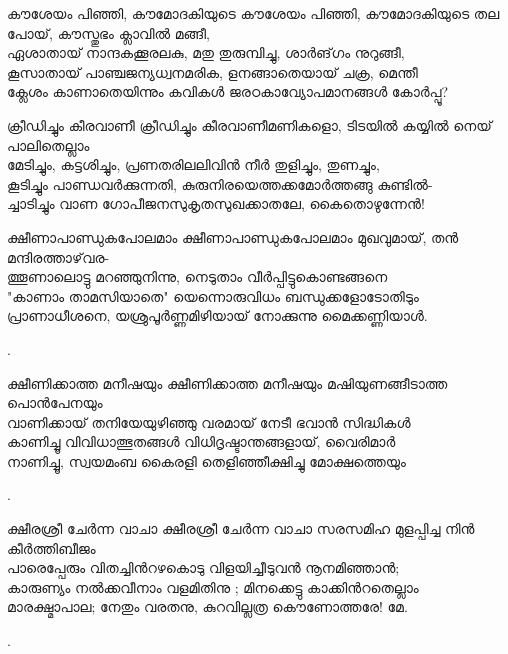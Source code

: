 \begin{enumerate}

\begin{slokam}{\VSr}{\AR}{കൗശേയം പിഞ്ഞി, കൗമോദകിയുടെ}
കൗശേയം പിഞ്ഞി, കൗമോദകിയുടെ തല പോയ്, കൗസ്തുഭം ക്ലാവിൽ മങ്ങീ,\\
ഏശാതായ് നാന്ദകക്കൂരലകു, മതു തുരുമ്പിച്ചു, ശാർങ്‌ഗം നുറുങ്ങീ,\\
കൂസാതായ് പാഞ്ചജന്യധ്വനമരിക, ളനങ്ങാതെയായ് ചക്ര, മെന്തീ \\
ക്ലേശം കാണാതെയിന്നും കവികൾ ജരഠകാവ്യോപമാനങ്ങൾ കോർപ്പൂ? 
\end{slokam}



\begin{slokam}{\VSr}{\VenM}{ക്രീഡിച്ചും കീരവാണീ}
ക്രീഡിച്ചും കീരവാണീമണികളൊ, ടിടയിൽ കയ്യിൽ നെയ്‌ പാലിതെല്ലാം\\
മേടിച്ചും, കട്ടശിച്ചും, പ്രണതരിലലിവിൻ നീർ തുളിച്ചും, തുണച്ചും,\\
കൂടിച്ചും പാണ്ഡവർക്കുന്നതി, കുരുനിരയെത്തക്കമോർത്തങ്ങു കുണ്ടിൽ-\\
ച്ചാടിച്ചും വാണ ഗോപീജനസുകൃതസുഖക്കാതലേ, കൈതൊഴുന്നേൻ!
\end{slokam}


\begin{slokam}{\VSv}{\VNM}{ക്ഷീണാപാണ്ഡുകപോലമാം}
ക്ഷീണാപാണ്ഡുകപോലമാം മുഖവുമായ്‌, തൻ മന്ദിരത്താഴ്‌വര-\\
ത്തൂണാലൊട്ടു മറഞ്ഞുനിന്നു, നെടുതാം വീർപ്പിട്ടുകൊണ്ടങ്ങനെ\\
"കാണാം താമസിയാതെ" യെന്നൊരുവിധം ബന്ധുക്കളോടോതിടും\\
പ്രാണാധീശനെ, യശ്രുപൂർണ്ണമിഴിയായ്‌ നോക്കുന്നു മൈക്കണ്ണിയാള്‍.
\end{slokam}


.



\begin{slokam}{\VSv}{\KA}{ക്ഷീണിക്കാത്ത മനീഷയും}
ക്ഷീണിക്കാത്ത മനീഷയും മഷിയുണങ്ങീടാത്ത പൊൻപേനയും\\
വാണിക്കായ്‌ തനിയേയുഴിഞ്ഞു വരമായ്‌ നേടീ ഭവാൻ സിദ്ധികള്‍\\
കാണിച്ചൂ വിവിധാത്ഭുതങ്ങള്‍ വിധിദൃഷ്ടാന്തങ്ങളായ്‌, വൈരിമാർ\\
നാണിച്ചൂ, സ്വയമംബ കൈരളി തെളിഞ്ഞീക്ഷിച്ചു മോക്ഷത്തെയും
\end{slokam}


.

\begin{slokam}{\VSr}{\Unk}{ക്ഷീരശ്രീ ചേർന്ന വാചാ}
ക്ഷീരശ്രീ ചേർന്ന വാചാ സരസമിഹ മുളപ്പിച്ച നിൻ കീർത്തിബീജം\\
പാരെപ്പേരും വിതച്ചിൻറഴകൊടു വിളയിച്ചീടുവൻ നൂനമിഞ്ഞാൻ;\\
കാരുണ്യം നൽക്കവീനാം വളമിതിനു ; മിനക്കെട്ടു കാക്കിൻറതെല്ലാം\\
മാരക്ഷ്മാപാല; നേതും വരതനു, കുറവില്ലത്ര കൌണോത്തരേ! മേ.
\end{slokam}


.

\end{enumerate}

